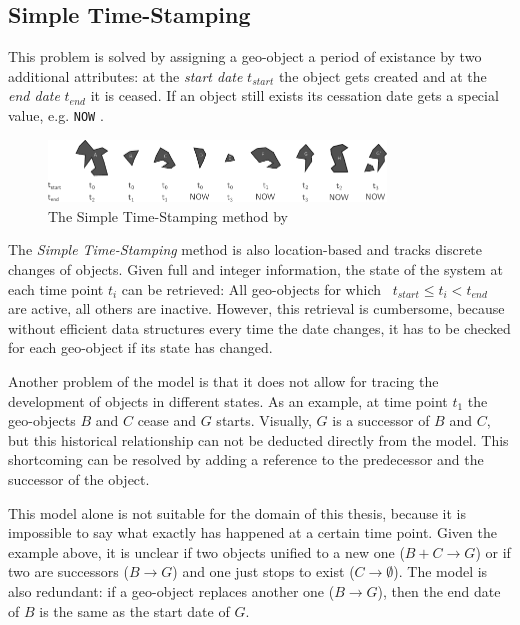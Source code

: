 
\subsection{Simple Time-Stamping} %
\label{sub:simple_time_stamping}

This problem is solved by assigning a geo-object a period of existance by two additional attributes: at the \emph{start date} $t_{start}$ the object gets created and at the \emph{end date} $t_{end}$ it is ceased. If an object still exists its cessation date gets a special value, e.g. \texttt{NOW}
\cite{hunter90timestamping}.

\begin{figure}[ht]
  \centering
  \includegraphics[width=0.8\textwidth]{graphics/basics/stdm/simple_time_stamping}
  \caption{The Simple Time-Stamping method by \cite{hunter90timestamping}}
  \label{fig:simple_time_stamping}
\end{figure}

The \emph{Simple Time-Stamping} method is also location-based and tracks discrete changes of objects. Given full and integer information, the state of the system at each time point $t_i$ can be retrieved: All geo-objects for which ~$t_{start} \leq t_i < t_{end}$~ are active, all others are inactive. However, this retrieval is cumbersome, because without efficient data structures every time the date changes, it has to be checked for each geo-object if its state has changed.

Another problem of the model is that it does not allow for tracing the development of objects in different states. As an example, at time point $t_1$ the geo-objects $B$ and $C$ cease and $G$ starts. Visually, $G$ is a successor of $B$ and $C$, but this historical relationship can not be deducted directly from the model. This shortcoming can be resolved by adding a reference to the predecessor and the successor of the object.

This model alone is not suitable for the domain of this thesis, because it is impossible to say what exactly has happened at a certain time point. Given the example above, it is unclear if two objects unified to a new one ($B+C \to G$) or if two are successors ($B \to G$) and one just stops to exist ($C \to \emptyset$). The model is also redundant: if a geo-object replaces another one ($B \to G$), then the end date of $B$ is the same as the start date of $G$.


